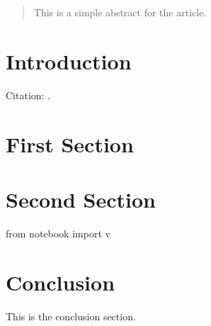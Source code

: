\usepackage{sagetex}



\maketitle

\begin{abstract}
This is a simple abstract for the article.
\end{abstract}

\section{Introduction}

Citation: \cite{refId}.

\section{First Section}

\section{Second Section}

\begin{sagesilent}
from notebook import v
\end{sagesilent}

\section{Conclusion}
This is the conclusion section.




